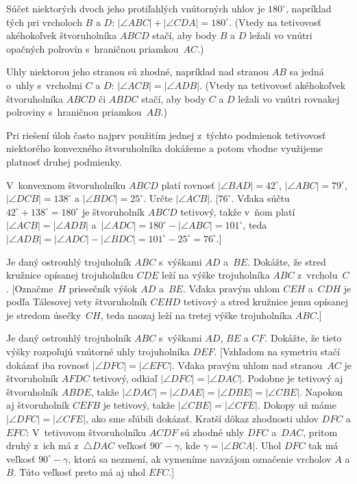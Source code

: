 {{\noindent\llap{$\triangleright$ }%
Súčet niektorých dvoch jeho protiľahlých vnútorných uhlov je $180^\circ$,
napríklad tých pri vrcholoch $B$ a $D$:
$|\angle ABC|+|\angle CDA|=180^\circ$. (Vtedy na tetivovosť
akéhokoľvek štvoruholníka $ABCD$ stačí, aby body $B$ a $D$ ležali
vo vnútri opačných polrovín s~hraničnou priamkou~$AC$.)

\noindent\llap{$\triangleright$ }%
Uhly  niektorou jeho stranou sú zhodné, napríklad
nad stranou $AB$ sa jedná o~uhly s~vrcholmi $C$ a $D$:
$|\angle ACB|=|\angle ADB|$. (Vtedy na tetivovosť
akéhokoľvek štvoruholníka $ABCD$ či $ABDC$ stačí,
aby body $C$ a $D$ ležali vo vnútri rovnakej polroviny
s~hraničnou priamkou~$AB$.)

Pri riešení úloh často najprv použitím jednej z~týchto podmienok
tetivovosť niektorého konvexného štvoruholníka dokážeme a potom
vhodne využijeme platnosť druhej podmienky.
\smallskip
}

V~konvexnom štvoruholníku $ABCD$ platí rovnosť
$|\angle BAD|=42^\circ$, $|\angle ABC|=79^\circ$,
$|\angle DCB|=138^\circ$ a $|\angle BDC|=25^\circ$.
Určte $|\angle ACB|$.
[$76^\circ$. Vďaka súčtu $42^\circ+138^\circ=180^\circ$
je štvoruholník $ABCD$ tetivový, takže v~ňom
platí $|\angle ACB|=|\angle ADB|$ a~$|\angle ADC|=180^\circ-|\angle ABC|=101^\circ$,
teda $|\angle ADB|=|\angle ADC|-|\angle BDC|=101^\circ-25^\circ=76^\circ$.]

Je daný ostrouhlý trojuholník $ABC$ s~výškami $AD$
a~$BE$.
Dokážte, že stred kružnice opísanej trojuholníku $CDE$
leží na výške trojuholníka $ABC$ z~vrcholu~$C$.
[Označme~$H$ priesečník výšok $AD$ a~$BE$. Vďaka pravým uhlom $CEH$ a~$CDH$
je podľa Tálesovej vety štvoruholník $CEHD$ tetivový
a stred kružnice jemu opísanej je stredom úsečky~$CH$, teda
naozaj leží na tretej výške trojuholníka $ABC$.]

Je daný ostrouhlý trojuholník $ABC$ s~výškami $AD$, $BE$ a $CF$.
Dokážte, že tieto výšky rozpoľujú vnútorné uhly trojuholníka $DEF$.
[Vzhľadom na symetriu stačí dokázať iba rovnosť
$|\angle DFC|=|\angle EFC|$.
Vďaka pravým uhlom nad stranou~$AC$
je štvoruholník $AFDC$ tetivový, odkiaľ $|\angle DFC|=|\angle DAC|$.
Podobne je tetivový aj štvoruholník $ABDE$, takže
$|\angle DAC|=|\angle DAE|=|\angle DBE|=|\angle CBE|$.
Napokon aj štvoruholník $CEFB$ je tetivový,
takže $|\angle CBE|=|\angle CFE|$. Dokopy už máme
$|\angle DFC|=|\angle CFE|$, ako sme sľúbili dokázať.
Kratší dôkaz zhodnosti uhlov $DFC$ a $EFC$: V~tetivovom
štvoruholníku $ACDF$ sú zhodné uhly $DFC$ a~$DAC$, pritom
druhý z~ich má z~$\triangle DAC$ veľkosť
$90^{\circ}-\gamma$, kde $\gamma=|\angle BCA|$. Uhol $DFC$ tak má
veľkosť $90^{\circ}-\gamma$, ktorá sa nezmení, ak vymeníme
navzájom označenie vrcholov $A$ a $B$. Túto veľkosť preto má aj uhol
$EFC$.]

}

